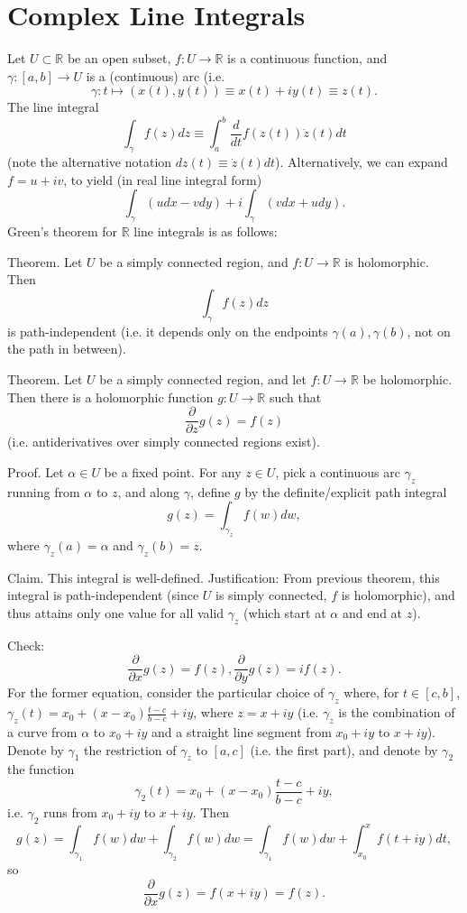 \documentclass{artikel3}
\date{\formatdate{2012}{04}{09}}
\newcommand{\complex}{\mathbb{R}}
\newcommand{\del}{\partial}
\begin{document}
\newcommand{\eqcite}[1]{\text{[#1]}}
\newcommand{\eqnref}[1]{Stmt. \ref{#1}}
\newcommand{\expval}[1]{\left\langle #1\right\rangle}
\newcommand{\closure}[1]{\overline{#1}}
\section{Complex Line Integrals}
Let $U\subset \complex$ be an open subset, $f:U\to \complex$ is a continuous
function, and $\gamma:[a,b]\to U$ is a (continuous) arc (i.e. \[
	\gamma:t\mapsto (x(t),y(t))\equiv x(t)+iy(t)\equiv z(t).
\] The line integral \[
	\int_{\gamma}f(z)dz \equiv \int_{a}^b \frac{d}{dt}f(z(t))\dot{z}(t)dt
\] (note the alternative notation $dz(t)\equiv \dot{z}(t)dt$).  Alternatively,
we can expand $f=u+iv$, to yield (in real line integral form) \[
	\int_\gamma (udx-vdy)+i\int_\gamma (vdx+udy).
\] Green's theorem for $\complex$ line integrals is as follows:

Theorem. Let $U$ be a simply connected region, and $f:U\to\complex$ is holomorphic.
Then \[
	\int_\gamma f(z)dz
\] is path-independent (i.e. it depends only on the endpoints $\gamma(a),\gamma(b)$,
not on the path in between).

Theorem. Let $U$ be a simply connected region, and let $f:U\to \complex$ be holomorphic.
Then there is a holomorphic function $g:U\to\complex$ such that \[
	\frac{\del}{\del z}g(z)=f(z)
\] (i.e. antiderivatives over simply connected regions exist).

Proof. Let $\alpha\in U$ be a fixed point.  For any $z\in U$, pick
a continuous arc $\gamma_z$ running from $\alpha$ to $z$, and along
$\gamma$, define $g$ by the definite/explicit path integral \[
	g(z)=\int_{\gamma_z} f(w)dw,
\] where $\gamma_z(a)=\alpha$ and $\gamma_z(b)=z$.

Claim. This integral is well-defined.  Justification: From previous theorem,
this integral is path-independent (since $U$ is simply connected, $f$ is holomorphic),
and thus attains only one value for all valid
$\gamma_z$ (which start at $\alpha$ and end at $z$).

Check: \[
	\frac{\del}{\del x}g(z)=f(z),\frac{\del}{\del y}g(z)=if(z).
\] For the former equation, consider the particular choice of $\gamma_z$
where, for $t\in [c,b]$, $\gamma_z(t)=x_0+(x-x_0)\frac{t-c}{b-c}+iy$, where $z=x+iy$
(i.e. $\gamma_z$ is the combination of a curve from $\alpha$ to $x_0+iy$
and a straight line segment from $x_0+iy$ to $x+iy$).
Denote by $\gamma_1$ the restriction of $\gamma_z$ to $[a,c]$ (i.e. the first
part), and
denote by $\gamma_2$ the function \[
	\gamma_2(t)=x_0+(x-x_0)\frac{t-c}{b-c}+iy,
\] i.e. $\gamma_2$ runs from $x_0+iy$ to $x+iy$.  Then \[
	g(z)=\int_{\gamma_1}f(w)dw+\int_{\gamma_2}f(w)dw
	= \int_{\gamma_1}f(w)dw+\int_{x_0}^{x}f(t+iy)dt,
\] so \[
	\frac{\del}{\del x}g(z)= f(x+iy)=f(z).
\]
\end{document}
